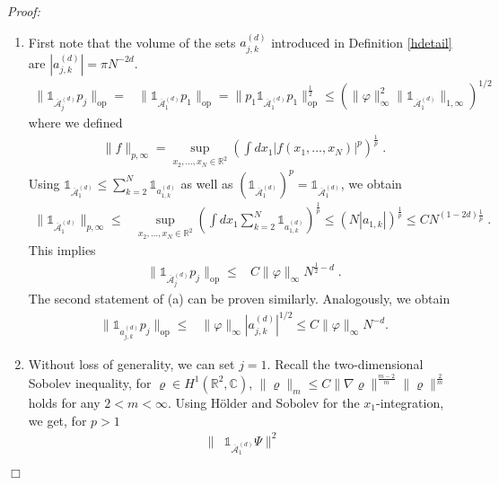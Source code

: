 \documentclass[11pt, english, american]{article}
\newenvironment{proof}{\emph{Proof:}}{\begin{flushright} $ \Box $ \end{flushright}}
\renewcommand{\phi}{\varphi}
\begin{document}
\begin{proof}
\begin{enumerate}
 \item First note that the volume of the sets $a^{(d)}_{j,k}$ introduced in Definition \ref{hdetail} are
$|a^{(d)}_{j,k}|=\pi N^{-2d}$.
 \begin{align*}
 \|\mathds{1}_{\overline{\mathcal{A}}^{(d)}_{j}}p_j\|_{\text{op}}=&
 \|\mathds{1}_{\overline{\mathcal{A}}^{(d)}_{1}}p_1\|_{\text{op}}=
 \|p_1\mathds{1}_{\overline{\mathcal{A}}^{(d)}_{1}}p_1\|_{\text{op}}^{\frac{1}{2}}
 \leq \left(\|\phi\|_\infty^2\|\mathds{1}_{\overline{\mathcal{A}}^{(d)}_{1}}\|_{1,\infty}\right)^{1/2}
\end{align*}
  where we defined
\begin{align*}
\|f \|_{p, \infty} =
\sup_{x_2, \dots, x_N \in \mathbb{R}^2} 
\left(
\int dx_1 |f(x_1, \dots, x_N)|^{p}
\right)^{\frac{1}{p}}
\;.
 \end{align*}
Using $\mathds{1}_{\overline{\mathcal{A}}^{(d)}_{1}} \leq \sum_{k=2}^N \mathds{1}_{a_{1,k}^{(d)}} $
as well as $\left(\mathds{1}_{\overline{\mathcal{A}}^{(d)}_{1}} \right)^p =\mathds{1}_{\overline{\mathcal{A}}^{(d)}_{1}}$,
  we obtain
\begin{align*}
\|\mathds{1}_{\overline{\mathcal{A}}^{(d)}_{1}} \|_{p, \infty}
\leq&
\sup_{x_2, \dots, x_N \in \mathbb{R}^2} 
\left(
\int dx_1 \sum_{k=2}^N \mathds{1}_{a_{1,k}^{(d)}} 
\right)^{\frac{1}{p}}
\leq
\left(
N |a_{1,k}|
\right)^{\frac{1}{p}}
\leq
C
N^{(1-2d) \frac{1}{p}}
\;.
\end{align*}
This implies
\begin{align*}
 \|\mathds{1}_{\overline{\mathcal{A}}^{(d)}_{j}}p_j\|_{\text{op}}
  \leq&
  C \|\phi\|_\infty N^{\frac{1}{2}-d}
  \;.
\end{align*}
The second statement of (a) can be proven similarly. Analogously, we obtain
 \begin{align*}
 \|\mathds{1}_{a^{(d)}_{j,k}}p_j\|_{\text{op}}\leq&\|\phi\|_\infty  |a^{(d)}_{j,k}|^{1/2} \leq  C \|\phi\|_\infty N^{-d}.
 \end{align*}
 \item
Without loss of generality, we can set $j=1$.
Recall the two-dimensional Sobolev inequality, for $\varrho \in H^1(\mathbb{R}^2,\mathbb{C})$,
$
\| \varrho \|_m \leq
 C \| \nabla \varrho\|^{\frac{m-2}{m}} \| \varrho \|^{\frac{2}{m}}
$ holds for any $2<m<\infty$.
Using H\"older and Sobolev for the $x_1$-integration, we get, for $p>1$
\begin{align*} \|
&\mathds{1}_{\overline{\mathcal{A}}^{(d)}_{1}}\Psi\|^2

\end{align*}
\end{enumerate}
\end{proof}
\end{document}
